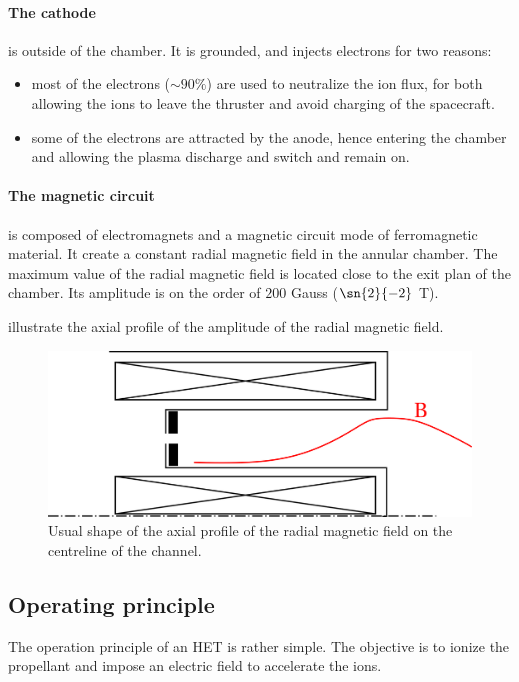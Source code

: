 \paragraph{The cathode} is outside of the chamber.
It is grounded, and injects electrons for two reasons:
\begin{itemize}
  \item most of the electrons ($\sim 90 \%$) are used to neutralize the ion flux, for both allowing the ions to leave the thruster and avoid charging of the spacecraft.
  \item some of the electrons are attracted by the anode, hence entering the chamber and allowing the plasma discharge and switch and remain on.
\end{itemize}

\paragraph{The magnetic circuit} is composed of electromagnets and a magnetic circuit mode of ferromagnetic material.
It create a constant radial magnetic field in the annular chamber.
The maximum value of the radial magnetic field is located close to the exit plan of the chamber.
Its amplitude is on the order of $200$ Gauss ($\sn{2}{-2}$ T).

 illustrate the axial profile of the amplitude of the radial magnetic field.
\begin{figure}[hbtp]
  \centering
  \includegraphics[width=\defaultwidth]{bshape}
  \caption{Usual shape of the axial profile of the radial magnetic field on the centreline of the channel.}
  \label{fig-bshape}
\end{figure}


\subsection{Operating principle}

The operation principle of an \ac{HET} is rather simple.
The objective is to ionize the propellant and impose an electric field to accelerate the ions.

